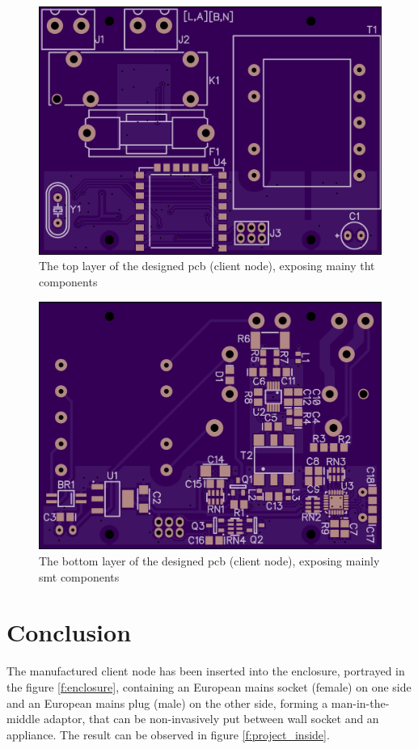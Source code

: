 \documentclass[journal]{IEEEtran}
\begin{document}
\begin{figure}[]
\centering
\includegraphics[width=.8\linewidth,angle=0]{pcb_top}
\caption{The top layer of the designed \gls{pcb} (client node), exposing mainy \gls{tht} components}\label{f:pcb_top}
\end{figure}
\begin{figure}[]
\centering
\includegraphics[width=.8\linewidth,angle=0]{pcb_bottom}
\caption{The bottom layer of the designed \gls{pcb} (client node), exposing mainly \gls{smt} components}\label{f:pcb_bottom}
\end{figure}


\section{Conclusion}

The manufactured client node has been inserted into the enclosure\cite{online:enclosure}, portrayed in the figure \ref{f:enclosure}, containing an European mains socket (female) on one side and an European mains plug (male) on the other side, forming a man-in-the-middle adaptor, that can be non-invasively put between wall socket and an appliance. The result can be observed in figure \ref{f:project_inside}.
\end{document}
